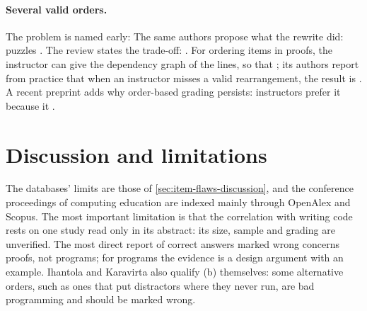 \paragraph{Several valid orders.} The problem is named early:
  The same authors propose what
the rewrite did: puzzles .  The review
states the trade-off: .  For ordering items in proofs,
the instructor can give the dependency graph of the lines, so that
; its authors report from practice that when an
instructor misses a valid rearrangement, the result is
.  A recent preprint adds why
order-based grading persists: instructors prefer it because it
.

\section{Discussion and limitations}
\label{sec:parsons-discussion}

The databases' limits are those of \cref{sec:item-flaws-discussion}, and
the conference proceedings of computing education are indexed mainly
through OpenAlex and Scopus.  The most important limitation is that the
correlation with writing code rests on one study read only in its
abstract: its size, sample and grading are unverified.  The most direct
report of correct answers marked wrong concerns proofs, not programs; for
programs the evidence is a design argument with an example.  Ihantola and
Karavirta also qualify (b) themselves: some alternative orders, such as
ones that put distractors where they never run, are bad programming and
should be marked wrong.

